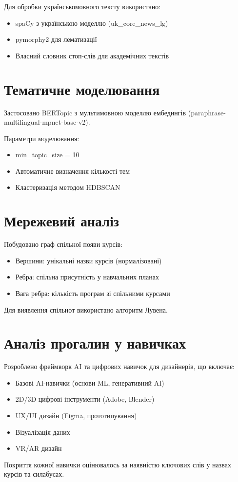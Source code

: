 Для обробки українськомовного тексту використано:
\begin{itemize}
    \item spaCy з українською моделлю (uk\_core\_news\_lg)
    \item pymorphy2 для лематизації
    \item Власний словник стоп-слів для академічних текстів
\end{itemize}

\section{Тематичне моделювання}

Застосовано BERTopic з мультимовною моделлю ембедингів
(paraphrase-multilingual-mpnet-base-v2).

Параметри моделювання:
\begin{itemize}
    \item min\_topic\_size = 10
    \item Автоматичне визначення кількості тем
    \item Кластеризація методом HDBSCAN
\end{itemize}

\section{Мережевий аналіз}

Побудовано граф спільної появи курсів:
\begin{itemize}
    \item Вершини: унікальні назви курсів (нормалізовані)
    \item Ребра: спільна присутність у навчальних планах
    \item Вага ребра: кількість програм зі спільними курсами
\end{itemize}

Для виявлення спільнот використано алгоритм Лувена.

\section{Аналіз прогалин у навичках}

Розроблено фреймворк AI та цифрових навичок для дизайнерів, що включає:
\begin{itemize}
    \item Базові AI-навички (основи ML, генеративний AI)
    \item 2D/3D цифрові інструменти (Adobe, Blender)
    \item UX/UI дизайн (Figma, прототипування)
    \item Візуалізація даних
    \item VR/AR дизайн
\end{itemize}

Покриття кожної навички оцінювалось за наявністю ключових слів у назвах
курсів та силабусах.
